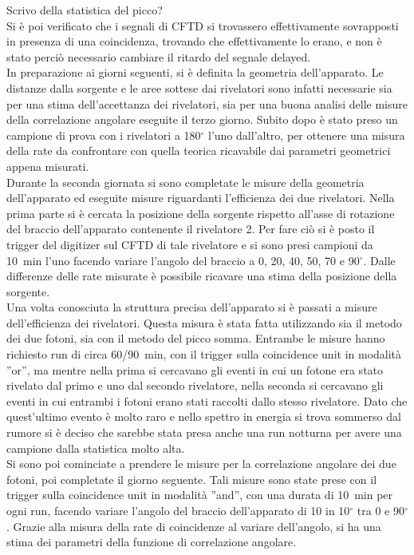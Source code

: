 Scrivo della statistica del picco?\\

Si è poi verificato che i segnali di CFTD si trovassero effettivamente sovrapposti in presenza di una coincidenza, trovando che effettivamente lo erano, e non è stato perciò necessario cambiare il ritardo del segnale delayed.\\

In preparazione ai giorni seguenti, si è definita la geometria dell'apparato. Le distanze dalla sorgente e le aree sottese dai rivelatori sono infatti necessarie sia per una stima dell'accettanza dei rivelatori, sia per una buona analisi delle misure della correlazione angolare eseguite il terzo giorno. Subito dopo è stato preso un campione di prova con i rivelatori a 180$^\circ$ l'uno dall'altro, per ottenere una misura della rate da confrontare con quella teorica ricavabile dai parametri geometrici appena misurati.\\

Durante la seconda giornata si sono completate le misure della geometria dell'apparato ed eseguite misure riguardanti l'efficienza dei due rivelatori. Nella prima parte si è cercata la posizione della sorgente rispetto all'asse di rotazione del braccio dell'apparato contenente il rivelatore 2. Per fare ciò si è posto il trigger del digitizer sul CFTD di tale rivelatore e si sono presi campioni da 10~min l'uno facendo variare l'angolo del braccio a 0, 20, 40, 50, 70 e 90$^\circ$. Dalle differenze delle rate misurate è possibile ricavare una stima della posizione della sorgente.\\

Una volta conosciuta la struttura precisa dell'apparato si è passati a misure dell'efficienza dei rivelatori. Questa misura è stata fatta utilizzando sia il metodo dei due fotoni, sia con il metodo del picco somma. Entrambe le misure hanno richiesto run di circa 60/90~min, con il trigger sulla coincidence unit in modalità ''or'', ma mentre nella prima si cercavano gli eventi in cui un fotone era stato rivelato dal primo e uno dal secondo rivelatore, nella seconda si cercavano gli eventi in cui entrambi i fotoni erano stati raccolti dallo stesso rivelatore. Dato che quest'ultimo evento è molto raro e nello spettro in energia si trova sommerso dal rumore si è deciso che sarebbe stata presa anche una run notturna per avere una campione dalla statistica molto alta.\\

Si sono poi cominciate a prendere le misure per la correlazione angolare dei due fotoni, poi completate il giorno seguente. Tali misure sono state prese con il trigger sulla coincidence unit in modalità ''and'', con una durata di 10~min per ogni run, facendo variare l'angolo del braccio dell'apparato di 10 in 10$^\circ$ tra 0 e 90$^\circ$. Grazie alla misura della rate di coincidenze al variare dell'angolo, si ha una stima dei parametri della funzione di correlazione angolare.\\
